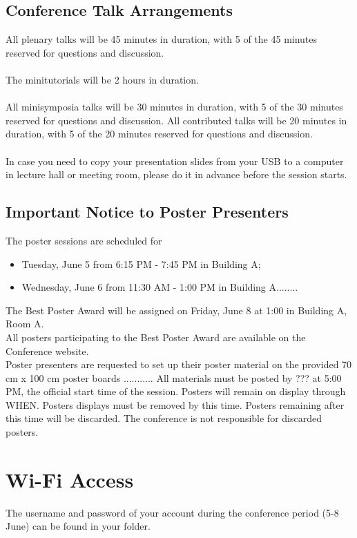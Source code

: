 \begin{multicols}{2}
\subsection*{Conference Talk Arrangements}
All plenary talks will be 45 minutes in duration,
with 5 of the 45 minutes reserved for questions and discussion.\\\\
The minitutorials will be 2 hours in duration.\\\\
All minisymposia talks will be 30 minutes in duration, with 5 of the 30
minutes reserved for questions and discussion.
All contributed talks will be 20 minutes in duration, with 5 of the 20
minutes reserved for questions and discussion.\\\\
In case you need to copy your presentation slides from your USB to a
computer in lecture hall or meeting room, please do it in advance before
the session starts.
\subsection*{Important Notice to Poster Presenters}
The poster sessions are scheduled for
\begin{itemize}
\item Tuesday, June 5 from 6:15 PM - 7:45 PM in Building A;
\item Wednesday, June 6 from 11:30 AM - 1:00 PM in Building A........
\end{itemize} 
The Best Poster Award will be assigned on Friday, June 8 at 1:00 in Building A, Room A.\\
All posters participating to the Best Poster Award are available on the Conference website.\\

Poster
presenters are requested to set up
their poster material on the provided
70 cm x 100 cm poster boards ........... 
All materials must
be posted by ??? at
5:00 PM, the official start time of
the session. Posters will remain on display through WHEN.
Posters displays must be removed by this time. Posters remaining after this time will be discarded.
The conference is not responsible for
discarded posters.
\section*{Wi-Fi Access}
The username and password of your account during the conference period (5-8 June) can be found in your folder.

\end{multicols}
